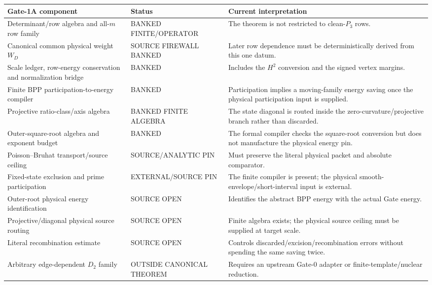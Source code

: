 \documentclass[11pt]{article}
\theoremstyle{definition}
\newcommand{\1}{\mathbf 1}
\newcommand{\status}[1]{\textsf{#1}}
\begin{document}
{{{\begin{center}
\renewcommand{\arraystretch}{1.18}
\begin{tabularx}{\textwidth}{>{\raggedright\arraybackslash}p{}
>{\raggedright\arraybackslash}p{}X}
\toprule
Gate-1A component & Status & Current interpretation\\
\midrule
Determinant/row algebra and all-$m$ row family & \status{BANKED FINITE/OPERATOR} &
The theorem is not restricted to clean-$P_3$ rows.\\
Canonical common physical weight $W_D$ & \status{SOURCE FIREWALL BANKED} &
Later row dependence must be deterministically derived from this one datum.\\
Scale ledger, row-energy conservation and normalization bridge & \status{BANKED} &
Includes the $H^2$ conversion and the signed vertex margins.\\
Finite BPP participation-to-energy compiler & \status{BANKED} &
Participation implies a moving-family energy saving once the physical participation input is supplied.\\
Projective ratio-class/axis algebra & \status{BANKED FINITE ALGEBRA} &
The state diagonal is routed inside the zero-curvature/projective branch rather than discarded.\\
Outer-square-root algebra and exponent budget & \status{BANKED} &
The formal compiler checks the square-root conversion but does not manufacture the physical energy pin.\\
Poisson--Bruhat transport/source ceiling & \status{SOURCE/ANALYTIC PIN} &
Must preserve the literal physical packet and absolute comparator.\\
Fixed-state exclusion and prime participation & \status{EXTERNAL/SOURCE PIN} &
The finite compiler is present; the physical smooth-envelope/short-interval input is external.\\
Outer-root physical energy identification & \status{SOURCE OPEN} &
Identifies the abstract BPP energy with the actual Gate energy.\\
Projective/diagonal physical source routing & \status{SOURCE OPEN} &
Finite algebra exists; the physical source ceiling must be supplied at target scale.\\
Literal recombination estimate & \status{SOURCE OPEN} &
Controls discarded/excision/recombination errors without spending the same saving twice.\\
Arbitrary edge-dependent $D_2$ family & \status{OUTSIDE CANONICAL THEOREM} &
Requires an upstream Gate-0 adapter or finite-template/nuclear reduction.\\
\bottomrule
\end{tabularx}
\end{center}

}}}
\end{document}

